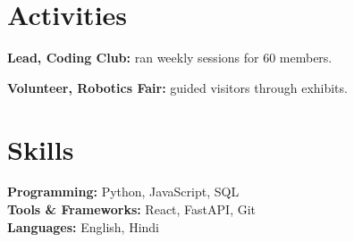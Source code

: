 \documentclass[a4paper,10pt]{article}
\begin{document}
\section{Activities}
\begin{bl}
  \item \textbf{Lead, Coding Club:} ran weekly sessions for 60 members.
  \item \textbf{Volunteer, Robotics Fair:} guided visitors through exhibits.
\end{bl}

\section{Skills}
\textbf{Programming:} Python, JavaScript, SQL\\[2pt]
\textbf{Tools \& Frameworks:} React, FastAPI, Git\\[2pt]
\textbf{Languages:} English, Hindi
\end{document}
